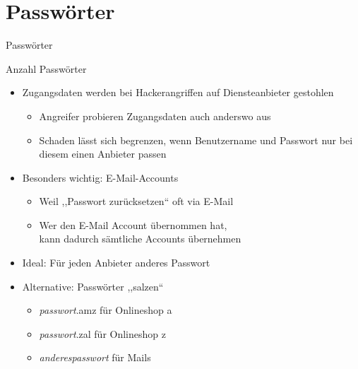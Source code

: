 \section{Passwörter}
\begin{frame}{Passwörter}


\end{frame}

\begin{frame}{Anzahl Passwörter}
  \begin{itemize}
    \item Zugangsdaten werden bei Hackerangriffen auf Diensteanbieter gestohlen
    \begin{itemize}
      \item Angreifer probieren Zugangsdaten auch anderswo aus
      \item Schaden lässt sich begrenzen, wenn Benutzername und Passwort nur bei diesem einen Anbieter passen
    \end{itemize}
    \item Besonders wichtig: E-Mail-Accounts
    \begin{itemize}
      \item Weil ,,Passwort zurücksetzen`` oft via E-Mail
      \item Wer den E-Mail Account übernommen hat,\\ kann dadurch sämtliche Accounts übernehmen
    \end{itemize}
    \item Ideal: Für jeden Anbieter anderes Passwort
    \item Alternative: Passwörter ,,salzen``
    \begin{itemize}
      \item \textit{passwort}.amz für Onlineshop a
      \item \textit{passwort}.zal für Onlineshop z
      \item \textit{anderespasswort} für Mails
    \end{itemize}
  \end{itemize}
\end{frame}

